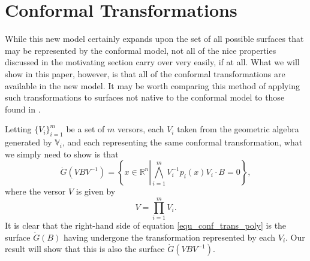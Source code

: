 \documentclass{ecgd-l}
\theoremstyle{definition}
\theoremstyle{remark}
\numberwithin{equation}{section}
\newcommand{\R}{\mathbb{R}}
\newcommand{\V}{\mathbb{V}}
\newcommand{\Gd}{\dot{G}}
\begin{document}
\section{Conformal Transformations}

While this new model certainly expands upon the set of all possible surfaces that may
be represented by
the conformal model, not all of the nice properties discussed in the motivating section
carry over very easily, if at all.
What we will show in this paper, however, is that all of the conformal transformations
are available in the new model.  It may be worth comparing this method
of applying such transformations to surfaces not native to the conformal model
to those found in \cite{Sobczyk12,Lasenby05}.

Letting $\{V_i\}_{i=1}^m$ be a set of $m$ versors, each $V_i$ taken from the
geometric algebra generated by $\V_i$, and each representing the same
conformal transformation, what we simply need to show is that
\begin{equation}\label{equ_conf_trans_poly}
\Gd(VBV^{-1}) = \left\{x\in\R^n\left|\bigwedge_{i=1}^m V_i^{-1}p_i(x)V_i\cdot B=0\right\}\right.,
\end{equation}
where the versor $V$ is given by
\begin{equation*}
V = \prod_{i=1}^m V_i.
\end{equation*}
It is clear that the right-hand side of equation \eqref{equ_conf_trans_poly} is
the surface $\Gd(B)$ having undergone the transformation represented by each $V_i$.
Our result will show that this is also the surface $\Gd(VBV^{-1})$.
\end{document}
